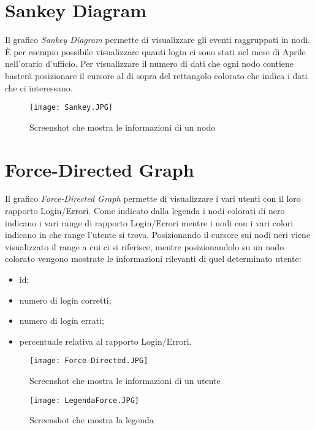 \section{Sankey Diagram}
Il grafico \textit{Sankey Diagram} permette di visualizzare gli eventi raggruppati in nodi.
È per esempio possibile visualizzare quanti login ci sono stati nel mese di Aprile nell'orario d'ufficio.
Per visualizzare il numero di dati che ogni nodo contiene basterà posizionare il cursore al di sopra del rettangolo colorato che indica i dati che ci interessano.

\begin{figure}[H]
    \texttt{[image: Sankey.JPG]}
    \caption{Screenshot che mostra le informazioni di un nodo}
\end{figure}

\section{Force-Directed Graph}
Il grafico \textit{Force-Directed Graph} permette di visualizzare i vari utenti con il loro rapporto Login/Errori.
Come indicato dalla legenda i nodi colorati di nero indicano i vari range di rapporto Login/Errori mentre i nodi con i vari colori indicano in che range l'utente si trova.
Posizionando il cursore sui nodi neri viene visualizzato il range a cui ci si riferisce, mentre posizionandolo su un nodo colorato vengono mostrate le informazioni rilevanti di quel determinato utente:
\begin{itemize}
  \item id;
  \item numero di login corretti;
  \item numero di login errati;
  \item percentuale relativa al rapporto Login/Errori.
\end{itemize}

\begin{figure}[H]
    \texttt{[image: Force-Directed.JPG]}
    \caption{Screenshot che mostra le informazioni di un utente}
\end{figure}
\begin{figure}[H]
    \centering
    \texttt{[image: LegendaForce.JPG]}
    \caption{Screenshot che mostra la legenda}
\end{figure}
